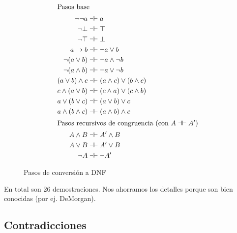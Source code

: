 \begin{figure}[H]
    \begin{align*}
        \intertext{Pasos base}
        \neg\neg a &\dashv\vdash
            a
            \\
        \neg \bot &\dashv\vdash
            \top\\
        \neg \top &\dashv\vdash
            \bot\\
        a \to b &\dashv\vdash
            \neg a \vee b
            \\
        \neg(a \vee b) &\dashv\vdash
            \neg a \wedge \neg b
            \\
        \neg(a \wedge b) &\dashv\vdash
            \neg a \vee \neg b
            \\
        (a \vee b) \wedge c &\dashv\vdash
            (a \wedge c) \vee (b \wedge c)
            \\
        c \wedge (a \vee b) &\dashv\vdash
            (c \wedge a) \vee (c \wedge b)
            \\
        a \vee (b \vee c) &\dashv\vdash
            (a \vee b) \vee c
            \\
        a \wedge (b \wedge c) &\dashv\vdash
            (a \wedge b) \wedge c\\
        \intertext{Pasos recursivos de congruencia (con $A \dashv\vdash A'$)}
        A \wedge B &\dashv\vdash A' \wedge B\\
        A \vee B &\dashv\vdash A' \vee B\\
        \neg A &\dashv\vdash \neg A'
    \end{align*}
    \caption{Pasos de conversión a DNF}
\end{figure}


En total son 26 demostraciones. Nos ahorramos los detalles porque son bien
conocidas (por ej. DeMorgan).


\subsection{Contradicciones}

